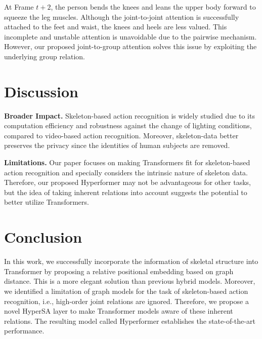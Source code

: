 \documentclass[10pt,twocolumn,letterpaper]{article}
\begin{document}
At Frame $t+2$, the person bends the knees and leans the upper body forward to squeeze the leg muscles. Although the joint-to-joint attention is successfully attached to the feet and waist, the knees and heels are less valued. This incomplete and unstable attention is unavoidable due to the pairwise mechanism. However, our proposed joint-to-group attention solves this issue by exploiting the underlying group relation.  

\section{Discussion}
\noindent\textbf{Broader Impact. }
Skeleton-based action recognition is widely studied due to its computation efficiency and robustness against the change of lighting conditions, compared to video-based action recognition. Moreover, skeleton-data better preserves the privacy since the identities of human subjects are removed. 

\noindent\textbf{Limitations.}
\label{limit}
Our paper focuses on making Transformers fit for skeleton-based action recognition and specially considers the intrinsic nature of skeleton data. Therefore, our proposed Hyperformer may not be advantageous for other tasks, but the idea of taking inherent relations into account suggests the potential to better utilize Transformers. 
\section{Conclusion}

In this work, we successfully incorporate the information of skeletal structure into Transformer by proposing a relative positional embedding based on graph distance. This is a more elegant solution than previous hybrid models. Moreover, we identified a limitation of graph models for the task of skeleton-based action recognition, i.e., high-order joint relations are ignored.
Therefore, we propose a novel HyperSA layer to make Transformer models aware of these inherent relations. 
The resulting model called Hyperformer establishes the state-of-the-art performance.

\clearpage

{\small


}
\end{document}
